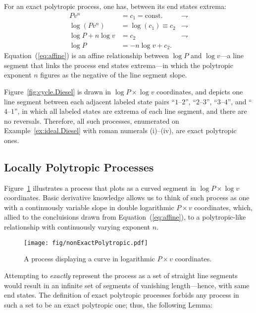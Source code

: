 \documentclass[fleqn,11pt]{SelfArx}
\begin{document}
    For an exact polytropic process, one has, between its end states extrema:%
    \begin{align}
        Pv^n & = c_1 = \text{const.}        & \rightharpoondown\\
        \log(Pv^n) & = \log(c_1) \equiv c_2 & \rightharpoondown\\
        \log P + n\log v & = c_2            & \rightharpoondown\\
        \log P & = -n\log v + c_2. \label{eq:affine}
    \end{align}
    Equation~(\ref{eq:affine}) is an affine relationship between $\log P$ and $\log v$---a  line
    segment that links the process end states extrema---in which  the  polytropic  exponent  $n$
    figures as the negative of the line segment slope.

    Figure~\ref{fig:cycle.Diesel} is drawn in $\log P \times \log v$  coordinates,  and  depicts
    one line segment between each  adjacent  labeled  state  pairs  ``$1$--$2$'',  ``$2$--$3$'',
    ``$3$--$4$'', and ``$4$--$1$'', in which  all  labeled  states  are  extrema  of  each  line
    segment,  and  there  are  no  reversals.  Therefore,  all  such  processes,  enumerated  on
    Example~\ref{ex:ideal.Diesel} with roman numerals (i)--(iv), are exact polytropic ones.

    \subsection{Locally Polytropic Processes}

    Figure~\ref{fig:non.exact} illustrates a process that plots as a curved segment in  $\log  P
    \times \log v$ coordinates. Basic derivative knowledge allows us to think of such process as
    one with a continuously variable slope in double logarithmic $P\times v$ coordinates, which,
    allied to the concluisions  drawn  from  Equation~(\ref{eq:affine}),  to  a  polytropic-like
    relationship with continuously varying exponent $n$.

    \begin{figure}[ht]
        \centering
        \texttt{[image: fig/nonExactPolytropic.pdf]}
        \caption{A process displaying a curve in logarithmic $P\times v$ coordinates.}
        \label{fig:non.exact}
    \end{figure}

    Attempting to \emph{exactly} represent the process as a set of straight line segments  would
    result in an infinite set of segments of vanishing length---hence, with same end states. The
    definition of exact polytropic processes forbids any process in such a set to  be  an  exact
    polytropic one; thus, the following Lemma:
\end{document}
